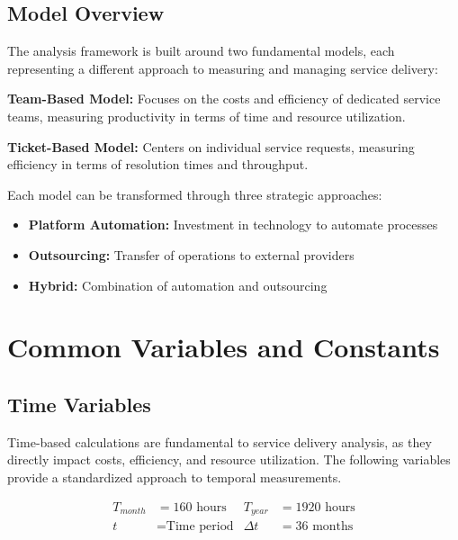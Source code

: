 \documentclass[12pt,a4paper]{article}
\newenvironment{definition}[1]
{\begin{mdframed}[style=definitionstyle,frametitle={Definition: #1}]}
{\end{mdframed}}
\newenvironment{explanation}
{\begin{mdframed}[style=explanationstyle,frametitle={Explanation}]}
{\end{mdframed}}
\begin{document}
\subsection{Model Overview}

\begin{explanation}
The analysis framework is built around two fundamental models, each representing a different approach to measuring and managing service delivery:

\textbf{Team-Based Model:} Focuses on the costs and efficiency of dedicated service teams, measuring productivity in terms of time and resource utilization.

\textbf{Ticket-Based Model:} Centers on individual service requests, measuring efficiency in terms of resolution times and throughput.

Each model can be transformed through three strategic approaches:
\begin{itemize}
    \item \textbf{Platform Automation:} Investment in technology to automate processes
    \item \textbf{Outsourcing:} Transfer of operations to external providers
    \item \textbf{Hybrid:} Combination of automation and outsourcing
\end{itemize}
\end{explanation}

\section{Common Variables and Constants}
\subsection{Time Variables}

Time-based calculations are fundamental to service delivery analysis, as they directly impact costs, efficiency, and resource utilization. The following variables provide a standardized approach to temporal measurements.

\begin{definition}{Time Parameters}
\begin{align*}
    T_{month} &= 160 \text{ hours} & T_{year} &= 1920 \text{ hours} \\
    t &= \text{Time period} & \Delta t &= 36 \text{ months}
\end{align*}
\end{definition}
\end{document}
